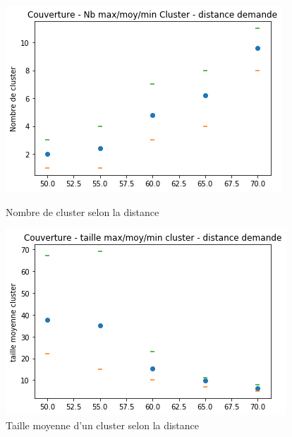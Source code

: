 \documentclass[a4paper]{article}
\begin{document}
\begin{figure}[h]
	\begin{minipage}[c]{.46\linewidth}
		\centering
		\includegraphics[width=1.1\linewidth]{../../script_results/Couverture_taille_cluster_groupe.png}
		\caption{Nombre de cluster selon la distance}
	\end{minipage}
	\hfill%
	\begin{minipage}[c]{.46\linewidth}
		\centering
		\includegraphics[width=1.1\linewidth]{../../script_results/Couverture_average_robot_groupe.png}
		\caption{Taille moyenne d'un cluster selon la distance}
	\end{minipage}
\end{figure}
\end{document}
